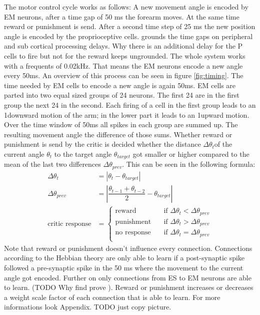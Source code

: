 The motor control cycle works as follows: A new movement angle is encoded by EM neurons, after a time gap of 50 ms the forearm moves. At the same time reward or punishment is send. After a second time step of 25 ms the new position angle is encoded by the proprioceptive cells. \cite{sebastianPaper} grounds the time gaps on peripheral and sub cortical processing delays. Why there is an additional delay for the P cells to fire but not for the reward keeps ungrounded. The whole system works with a frequents of 0.02kHz. That means the EM neurons encode a new angle every 50ms. An overview of this process can be seen in figure \ref{fig:timing}.
The time needed by EM cells to encode a new angle is again 50ms. EM cells are parted into two equal sized groups of 24 neurons. The first 24 are in the first group the next 24 in the second. Each firing of a cell in the first group leads to an 1\degree  downward motion of the arm; in the lower part it leads to an 1\degree  upward motion. Over the time window of 50ms all spikes in each group are summed up. The resulting movement angle the difference of those sums.
Whether reward or punishment is send by the critic is decided whether the distance $\Delta\theta_t $of the current angle $\theta_t$  to the target angle $\theta_{target}$ got smaller or higher compared to the mean of the last two differences $\Delta\theta_{prev}$. This can be seen in the following formula:
\begin{align*}
	\Delta\theta_t &= |\theta_t-\theta_{target}|\\
	\Delta\theta_{prev} &= \left| \dfrac{\theta_{t-1}+\theta_{t-2}}{2} -\theta_{target}  \right |\\
	\text{critic response} &= 
	\begin{cases}
	\text{reward} &  \quad \text{if } \Delta\theta_t < \Delta\theta_{prev}\\
	\text{punishment}& \quad \text{if } \Delta\theta_t > \Delta\theta_{prev}\\
	\text{no response}& \quad \text{if } \Delta\theta_t = \Delta\theta_{prev}\\
	\end{cases}
\end{align*}
Note that reward or punishment doesn't influence every connection. Connections according to the Hebbian theory \cite{originalHebbianLaw} are only able to learn if a post-synaptic spike followed a pre-synaptic spike in the 50 ms where the movement to the current angle got encoded. Further on only connections from ES to EM neurons are able to learn. (TODO Why find prove ).  Reward or punishment increases or decreases a weight scale factor of each connection that is able to learn. For more informations look Appendix. TODO just copy picture.
